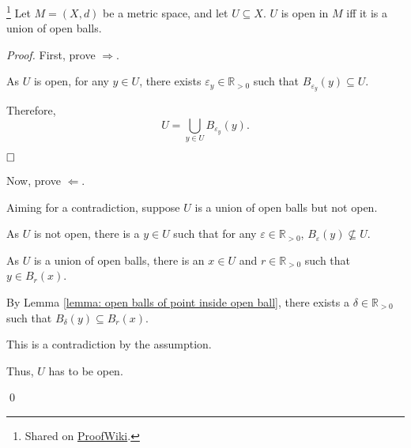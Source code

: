 \begin{theorem}
	\label{theorem: set is open iff union of open balls}
	\footnote{
		Shared on \href{https://proofwiki.org/wiki/Set_is_Open_iff_Union_of_Open_Balls}{ProofWiki}.
	}
	Let $M = (X, d)$ be a metric space, and let $U \subseteq X$. $U$ is open in $M$ iff it is a union of open balls.
	
	\begin{proof}
		First, prove $\Rightarrow$.
		
		As $U$ is open, for any $y \in U$, there exists $\varepsilon_y \in \mathbb R_{> 0}$ such that $B_{\varepsilon_y}(y) \subseteq U$.
		
		Therefore,
		$$
		U = \bigcup_{y \in U} B_{\varepsilon_y} (y).
		$$
		
		$\qedlemma$
		
		Now, prove $\Leftarrow$.
		
		Aiming for a contradiction, suppose $U$ is a union of open balls but not open.
		
		As $U$ is not open, there is a $y \in U$ such that for any $\varepsilon \in \mathbb R_{> 0}$, $B_\varepsilon (y) \not \subseteq U$.
		
		As $U$ is a union of open balls, there is an $x \in U$ and $r \in \mathbb R_{> 0}$ such that $y \in B_r (x)$.
		
		By Lemma \ref{lemma: open balls of point inside open ball}, there exists a $\delta \in \mathbb R_{> 0}$ such that $B_\delta (y) \subseteq B_r (x)$.
		
		This is a contradiction by the assumption.
		
		Thus, $U$ has to be open.
		
		\qed
	\end{proof}
\end{theorem}


